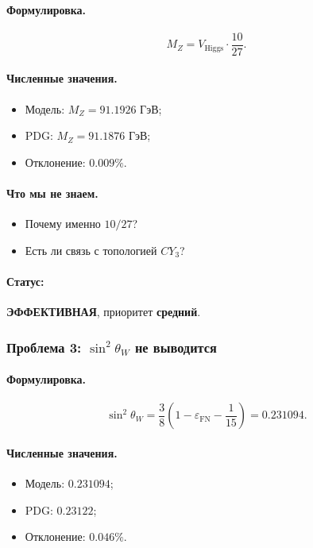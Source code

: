 \documentclass[11pt,a4paper]{article}
\newcommand{\CY}{CY_3}
\newcommand{\epsFN}{\varepsilon_{\text{FN}}}
\theoremstyle{definition}
\begin{document}
\paragraph{Формулировка.}
\begin{equation}
    M_Z = V_{\text{Higgs}} \cdot \frac{10}{27}.
\end{equation}

\paragraph{Численные значения.}
\begin{itemize}
    \item Модель: $M_Z = 91.1926$ ГэВ;
    \item PDG: $M_Z = 91.1876$ ГэВ;
    \item Отклонение: $0.009\%$.
\end{itemize}

\paragraph{Что мы не знаем.}
\begin{itemize}
    \item Почему именно $10/27$?
    \item Есть ли связь с топологией $\CY$?
\end{itemize}

\paragraph{Статус:} \textbf{ЭФФЕКТИВНАЯ}, приоритет \textbf{средний}.

\subsubsection{Проблема 3: $\sin^2\theta_W$ не выводится}

\paragraph{Формулировка.}
\begin{equation}
    \sin^2\theta_W = \frac{3}{8} \left(1 - \epsFN - \frac{1}{15}\right)
    = 0.231094.
\end{equation}

\paragraph{Численные значения.}
\begin{itemize}
    \item Модель: $0.231094$;
    \item PDG: $0.23122$;
    \item Отклонение: $0.046\%$.
\end{itemize}
\end{document}

